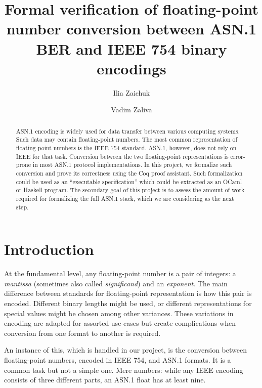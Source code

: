 \documentclass[sigplan]{acmart}
\begin{document}
\title{Formal verification of floating-point number conversion between ASN.1 BER and IEEE 754 binary encodings}

\author{Ilia Zaichuk}

\author{Vadim Zaliva}

\begin{abstract}

ASN.1 encoding is widely used for data transfer between various computing systems.
Such data may contain floating-point numbers. The most common representation of
floating-point numbers is the IEEE 754 standard. ASN.1, however, does not rely
on IEEE for that task. Conversion between the two floating-point
representations is error-prone in most ASN.1 protocol implementations. In this
project, we formalize such conversion and prove its correctness using the Coq
proof assistant. Such formalization could be used as an ``executable specification'' which
could be extracted as an OCaml or Haskell program. The secondary goal of this project is
to assess the amount of work required for formalizing the full ASN.1 stack, which
we are considering as the next step.

\end{abstract}


\maketitle



\section{Introduction}

At the fundamental level, any floating-point number is a pair of integers: a \textit{mantissa}
(sometimes also called \textit{significand}) and an \textit{exponent}. The main difference between
standards for floating-point representation is how this pair is encoded. Different binary lengths
might be used, or different representations for special values might be chosen among other variances. These variations in encoding
are adapted for assorted use-cases but create complications when conversion from one format to another
is required.

An instance of this, which is handled in our project, is the conversion between floating-point numbers,
encoded in IEEE 754, and ASN.1 formats. It is a common task but not a simple one.
Mere numbers: while any IEEE encoding consists of three different parts, an ASN.1 float has at least nine.
\end{document}
